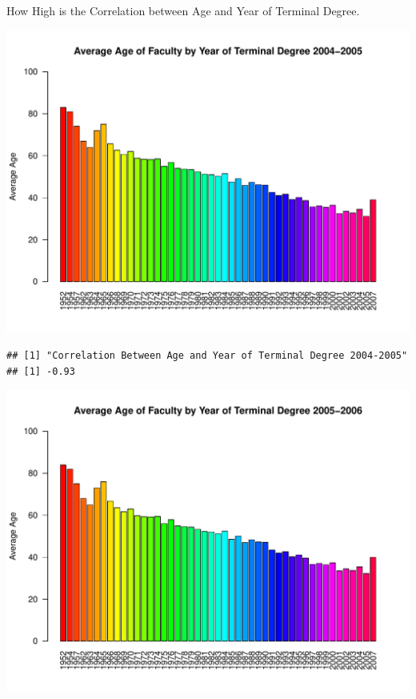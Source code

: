 \documentclass[12pt,a4paper]{article}\usepackage[]{graphicx}\usepackage[]{color}
\makeatletter
\def\maxwidth{ %
  \ifdim\Gin@nat@width>\linewidth
    \linewidth
  \else
    \Gin@nat@width
  \fi
}
\newenvironment{kframe}{%
 \def\at@end@of@kframe{}%
 \ifinner\ifhmode%
  \def\at@end@of@kframe{\end{minipage}}%
  \begin{minipage}{\columnwidth}%
 \fi\fi%
 \def\FrameCommand##1{\hskip\@totalleftmargin \hskip-\fboxsep
 \colorbox{shadecolor}{##1}\hskip-\fboxsep
     \hskip-\linewidth \hskip-\@totalleftmargin \hskip\columnwidth}%
 \MakeFramed {\advance\hsize-\width
   \@totalleftmargin\z@ \linewidth\hsize
   \@setminipage}}%
 {\par\unskip\endMakeFramed%
 \at@end@of@kframe}
\newenvironment{knitrout}{}{} %
\theoremstyle{definition}
\makeatother
\begin{document}
\bigskip
How High is the Correlation between Age and Year of Terminal Degree.

\begin{knitrout}
\color{fgcolor}
\includegraphics[width=\maxwidth]{figure/unnamed-chunk-12-1} 
\begin{kframe}\begin{verbatim}
## [1] "Correlation Between Age and Year of Terminal Degree 2004-2005"
## [1] -0.93
\end{verbatim}
\end{kframe}
\includegraphics[width=\maxwidth]{figure/unnamed-chunk-12-2} 
\begin{kframe}\begin{verbatim}

\end{verbatim}
\end{kframe}
\end{knitrout}
\end{document}
